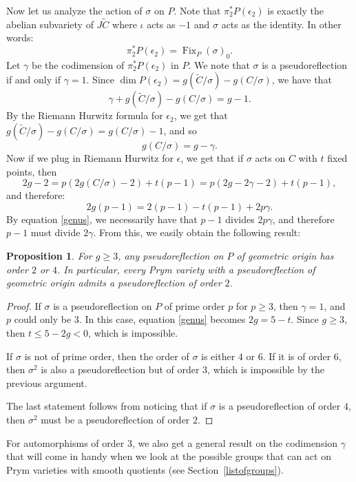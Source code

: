 \documentclass[preprint,12pt]{amsart}
\def\tC{\ensuremath{\tilde{C}}}
\DeclareMathOperator{\Fix}{Fix}
\theoremstyle{plain}
\newtheorem{proposition}[proposition]{Proposition}
\theoremstyle{definition}
\begin{document}
Now let us analyze the action of $\sigma$ on $P$.
Note that $\pi_2^*P(\epsilon_2)$ is exactly the abelian subvariety of $J\tC$ where $\iota$ acts as $-1$ and $\sigma$ acts as the identity.
In other words:
\[\pi_2^*P(\epsilon_2)=\Fix_P(\sigma)_0.\]
Let $\gamma $ be the codimension of $\pi_2^*P(\epsilon_2)$ in $P$.
We note that $\sigma$ is a pseudoreflection if and only if $\gamma=1$.
Since $\dim P(\epsilon_2)=g(\tC/\sigma)-g(C/\sigma)$, we have that
\[\gamma +g(\tC/\sigma)-g(C/\sigma)=g-1.\]
By the Riemann Hurwitz formula for $\epsilon_2$, we get that $g(\tC/\sigma)-g(C/\sigma)=g(C/\sigma)-1$, and so
\[g(C/\sigma)=g-\gamma .\]
Now if we plug in Riemann Hurwitz for $\epsilon$, we get that if $\sigma$ acts on $C$ with $t$ fixed points, then
\[
2g-2=p(2g(C/\sigma)-2)+t(p-1)=p(2g-2\gamma -2)+t(p-1),
\]
and therefore:
\begin{equation}\label{genus}
2g(p-1)=2(p-1)-t(p-1)+2p\gamma .
\end{equation}
By equation \eqref{genus}, we necessarily have that $p-1$ divides $2p\gamma $, and therefore $p-1$ must divide $2\gamma$.
From this, we easily obtain the following result:

\begin{proposition}\label{noPseudoHigherOrder} For $g\ge 3$,
any pseudoreflection on $P$ of geometric origin has
order $2$ or $4$. In particular, every Prym variety with a pseudoreflection of geometric origin admits a pseudoreflection of order $2$.
\end{proposition}
\begin{proof}
 If $\sigma$ is a pseudoreflection on $P$ of prime order $p$ for $p\geq 3$, then $\gamma =1$, and $p$ could only be $3$.
 In this case, equation \eqref{genus} becomes $2g=5-t$.
 Since $g\ge 3$, then $t\le 5-2g<0$, which is impossible. 
 
 If $\sigma$ is not of prime order, then the order of $\sigma$ is either $4$ or $6$. If it is of order $6$, then $\sigma^2$ is also a pseudoreflection but of order $3$, which is impossible by the previous argument.

 The last statement follows from noticing that if $\sigma$ is a pseudoreflection of order $4$, then $\sigma^2$ must be a pseudoreflection of order $2$.
 \end{proof}

For automorphisms of order $3$, we also get a general result on the codimension $\gamma$ that will come in handy when we look at the possible groups that can act on Prym varieties with smooth quotients (see Section~\ref{listofgroups}).
\end{document}
